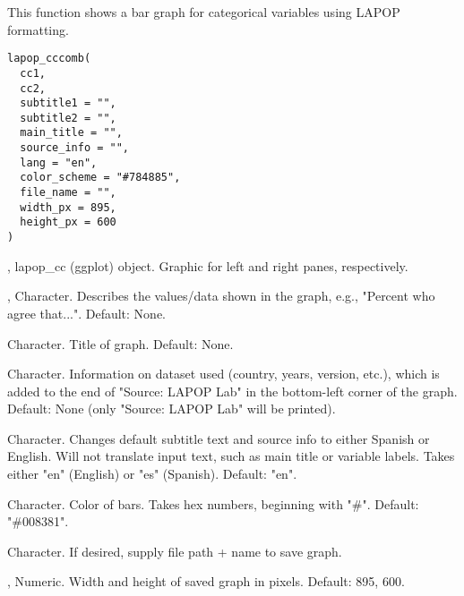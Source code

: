 \documentclass[a4paper]{book}
\begin{document}
%
\begin{Description}
This function shows a bar graph for categorical variables using LAPOP formatting.
\end{Description}
%
\begin{Usage}
\begin{verbatim}
lapop_cccomb(
  cc1,
  cc2,
  subtitle1 = "",
  subtitle2 = "",
  main_title = "",
  source_info = "",
  lang = "en",
  color_scheme = "#784885",
  file_name = "",
  width_px = 895,
  height_px = 600
)
\end{verbatim}
\end{Usage}
%
\begin{Arguments}
\begin{ldescription}
\item[\code{cc1}, \code{cc2}] lapop\_cc (ggplot) object.  Graphic for left and right panes, respectively.

\item[\code{subtitle1}, \code{subtitle2}] Character.  Describes the values/data shown in the graph, e.g., "Percent who agree that...".
Default: None.

\item[\code{main\_title}] Character.  Title of graph.  Default: None.

\item[\code{source\_info}] Character.  Information on dataset used (country, years, version, etc.),
which is added to the end of "Source: LAPOP Lab" in the bottom-left corner of the graph.
Default: None (only "Source: LAPOP Lab" will be printed).

\item[\code{lang}] Character.  Changes default subtitle text and source info to either Spanish or English.
Will not translate input text, such as main title or variable labels.  Takes either "en" (English)
or "es" (Spanish).  Default: "en".

\item[\code{color\_scheme}] Character.  Color of bars.
Takes hex numbers, beginning with "\#". Default: "\#008381".

\item[\code{file\_name}] Character.  If desired, supply file path + name to save graph.

\item[\code{width\_px}, \code{height\_px}] Numeric.  Width and height of saved graph in pixels. Default: 895, 600.
\end{ldescription}
\end{Arguments}
\end{document}
